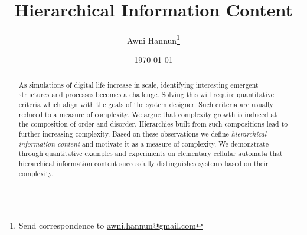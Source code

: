 \documentclass[12pt]{article}
\title{Hierarchical Information Content}
\author{Awni Hannun\footnote{
  Send correspondence to
  \href{mailto:awni.hannun@gmail.com}{awni.hannun@gmail.com}}}
\date{\today}
\theoremstyle{definition}
\begin{document}
\maketitle

\begin{abstract}
  As simulations of digital life increase in scale, identifying interesting
  emergent structures and processes becomes a challenge.  Solving this will
  require quantitative criteria which align with the goals of the system
  designer. Such criteria are usually reduced to a measure of complexity. We
  argue that complexity growth is induced at the composition of order and
  disorder. Hierarchies built from such compositions lead to further increasing
  complexity. Based on these observations we define \emph{hierarchical
  information content} and motivate it as a measure of complexity. We
  demonstrate through quantitative examples and experiments on elementary
  cellular automata that hierarchical information content successfully
  distinguishes systems based on their complexity.
\end{abstract}








\end{document}
